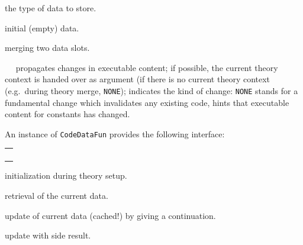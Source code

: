 \begin{isabellebody}
\begin{isamarkuptext}
\begin{description}
  \item {} the type of data to store.

  \item {} initial (empty) data.

  \item {} merging two data slots.

  \item {}~~ propagates changes in executable content;
    if possible, the current theory context is handed over
    as argument  (if there is no current theory context (e.g.~during
    theory merge, \verb|NONE|);  indicates the kind
    of change: \verb|NONE| stands for a fundamental change
    which invalidates any existing code, 
    hints that executable content for constants 
    has changed.

  \end{description}

  An instance of \verb|CodeDataFun| provides the following
  interface:

  \medskip
  \begin{tabular}{l}
  \isa{init{\isacharcolon}\ theory\ {\isasymrightarrow}\ theory} \\
  \isa{get{\isacharcolon}\ theory\ {\isasymrightarrow}\ T} \\
  \isa{change{\isacharcolon}\ theory\ {\isasymrightarrow}\ {\isacharparenleft}T\ {\isasymrightarrow}\ T{\isacharparenright}\ {\isasymrightarrow}\ T} \\
  \isa{change{\isacharunderscore}yield{\isacharcolon}\ theory\ {\isasymrightarrow}\ {\isacharparenleft}T\ {\isasymrightarrow}\ {\isacharprime}a\ {\isacharasterisk}\ T{\isacharparenright}\ {\isasymrightarrow}\ {\isacharprime}a\ {\isacharasterisk}\ T}
  \end{tabular}

  \begin{description}

  \item {} initialization during theory setup.

  \item {} retrieval of the current data.

  \item {} update of current data (cached!)
    by giving a continuation.

  \item {} update with side result.


\end{description}
\end{isamarkuptext}
\end{isabellebody}
